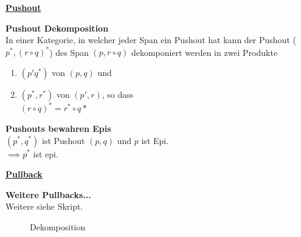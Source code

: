 \begin{multicols}{2}

\textbf{\underline{Pushout}} 

\textbf{ Pushout Dekomposition} \\
In einer Kategorie, in welcher jeder Span ein Pushout hat kann der Pushout ($p^*, (r \circ q)^*$) des Span $(p, r \circ q)$ dekomponiert werden in zwei Produkte 
\begin{enumerate}
\item $(p' q^*)$ von $(p,q)$ und 
\item $(p^*, r^*)$ von $(p', r)$, so dass \\ $(r \circ q)^* = r^* \circ q*$
\end{enumerate}

\textbf{ Pushouts bewahren Epis} \\
$(p^*, q^*)$ ist Pushout $(p,q)$ und $p$ ist Epi.\\
$\implies p^*$ ist epi.


\columnbreak

\textbf{\underline{Pullback}} 

\textbf{Weitere Pullbacks...} \\
Weitere siehe Skript.

\end{multicols}

\begin{figure}[h]
\centering
{} \qquad \qquad \qquad
{}
\caption{Dekomposition}
\end{figure}

